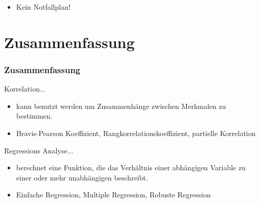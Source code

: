 \documentclass{beamer}
\begin{document}
\begin{frame}

 \begin{itemize}
  \item<5> Kein Notfallplan!
 \end{itemize}

\end{frame}


\section{Zusammenfassung}

\begin{frame}
 \frametitle{Zusammenfassung}
 
 \begin{block}{Korrelation...}
  \begin{itemize}
   \item kann benutzt werden um Zusammenh\"ange zwischen Merkmalen zu bestimmen.
   \item Bravis-Pearson Koeffizient, Rangkorrelationskoeffizient, partielle Korrelation
  \end{itemize}
 \end{block}

 \begin{block}{Regressions Analyse...}
  \begin{itemize}
   \item berechnet eine Funktion, die das Verh\"altnis einer abh\"angigen Variable zu einer oder mehr unabh\"angigen beschreibt.
   \item Einfache Regression, Multiple Regression, Robuste Regression
  \end{itemize}
 \end{block}

\end{frame}
\end{document}
